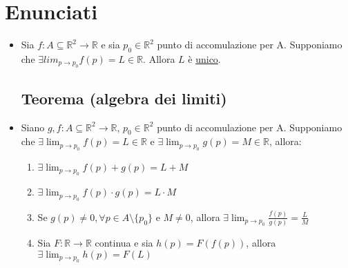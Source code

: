 \documentclass{report}
\newcommand{\ace}{\`e }
\newcommand{\aca}{\`a }
\newcommand{\Ins}[1]{\mathbb{#1}}
\newcommand{\R}{\Ins{R}}
\newcommand{\f}{f: A \subseteq \R^2 \to \R}
\begin{document}
  \section{Enunciati}
  \begin{itemize}
    \subsection{Unicit\aca del limite}
    \item Sia $\f$ e sia $p_0 \in \R^2$ punto di accomulazione per A. Supponiamo che 
          $\exists lim_{p \to p_0} f(p) = L \in \R$. Allora $L$ \ace \underline{unico}.

    \subsection{Teorema (algebra dei limiti)}
    \item Siano $g,\f$, $p_0 \in \R^2$ punto di accomulazione per A. Supponiamo che 
          $\exists \lim_{p\to p_0} f(p) = L \in \R$ e $\exists \lim_{p\to p_0} g(p) = M \in \R$, allora:
          \begin{enumerate}
            \item $\exists \lim_{p\to p_0} f(p) + g(p)= L + M$
            \item $\exists \lim_{p\to p_0} f(p) \cdot g(p)= L \cdot M$
            \item Se $g(p) \not = 0, \forall p \in A\setminus \{p_0\}$ e $M \not = 0$, allora $\exists \lim_{p\to p_0} \frac{f(p)}{g(p)} = \frac{L}{M}$
            \item Sia $F:\R \to \R$ continua e sia $h(p) = F(f(p))$, allora $\exists  \lim_{p\to p_0} h(p) = F(L)$
          \end{enumerate}
  \end{itemize}
\end{document}
